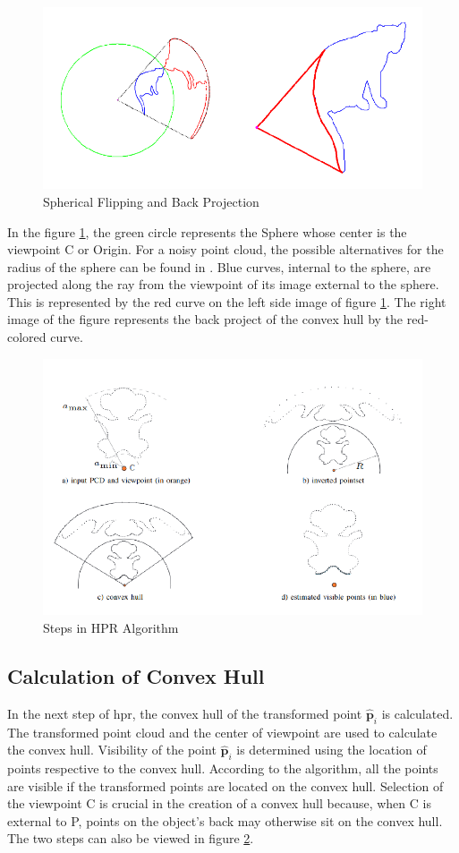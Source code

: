 \begin{figure}[htbp]
    \centering
    \includegraphics[width=0.5\linewidth]{97_graphics/related_work/spherical_flipping.pdf}
    \caption{Spherical Flipping and Back Projection\parencite{katz2007}}
    \label{fig:related_work-spherical_flipping}
\end{figure}

In the figure \ref{fig:related_work-spherical_flipping}, the green circle represents the Sphere whose center is the viewpoint C or Origin. For a noisy point cloud, the possible alternatives for the radius of the sphere can be found in \parencite{mehra_visibility_XXXX}. Blue curves, internal to the sphere, are projected along the ray from the viewpoint of its image external to the sphere.  This is represented by the red curve on the left side image of figure \ref{fig:related_work-spherical_flipping}. The right image of the figure represents the back project of the convex hull by the red-colored curve.

\begin{figure}[htb]
    \centering
    \includegraphics[width=0.8\linewidth]{97_graphics/related_work/hpr_2.pdf}
    \caption{Steps in HPR Algorithm \parencite{mehra_visibility_XXXX}}
    \label{fig:realted_work-hpr}
\end{figure}

\subsection{Calculation of Convex Hull}
In the next step of \acrshort{hpr}, the convex hull of the transformed point \(\hat{\mathbf{p}}_i \) is calculated. The transformed point cloud and the center of viewpoint are used to calculate the convex hull. Visibility of the point \(\hat{\mathbf{p}}_i \) is determined using the location of points respective to the convex hull. According to the algorithm, all the points are visible if the transformed points are located on the convex hull. Selection of the viewpoint C is crucial in the creation of a convex hull because, when C is external to P, points on the object's back may otherwise sit on the convex hull. The two steps can also be viewed in figure \ref{fig:realted_work-hpr}.


